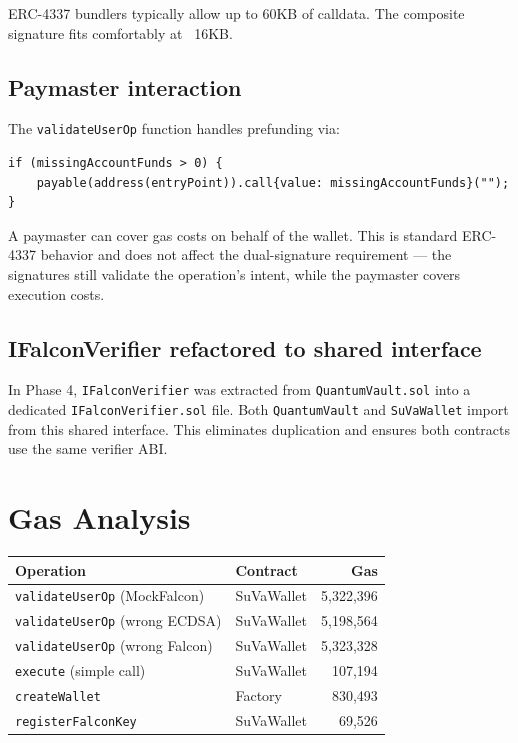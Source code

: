 \documentclass[11pt,a4paper]{article}
\begin{document}
ERC-4337 bundlers typically allow up to 60KB of calldata. The composite signature fits
comfortably at ~16KB.

\subsection{Paymaster interaction}

The \texttt{validateUserOp} function handles prefunding via:
\begin{lstlisting}[style=solidity]
if (missingAccountFunds > 0) {
    payable(address(entryPoint)).call{value: missingAccountFunds}("");
}
\end{lstlisting}

A paymaster can cover gas costs on behalf of the wallet. This is standard ERC-4337 behavior
and does not affect the dual-signature requirement --- the signatures still validate the
operation's intent, while the paymaster covers execution costs.

\subsection{IFalconVerifier refactored to shared interface}

In Phase 4, \texttt{IFalconVerifier} was extracted from \texttt{QuantumVault.sol} into a
dedicated \texttt{IFalconVerifier.sol} file. Both \texttt{QuantumVault} and \texttt{SuVaWallet}
import from this shared interface. This eliminates duplication and ensures both contracts
use the same verifier ABI.

\section{Gas Analysis}

\begin{center}
\begin{tabular}{llr}
\toprule
\textbf{Operation} & \textbf{Contract} & \textbf{Gas} \\
\midrule
\texttt{validateUserOp} (MockFalcon) & SuVaWallet & 5,322,396 \\
\texttt{validateUserOp} (wrong ECDSA) & SuVaWallet & 5,198,564 \\
\texttt{validateUserOp} (wrong Falcon) & SuVaWallet & 5,323,328 \\
\texttt{execute} (simple call)         & SuVaWallet &   107,194 \\
\texttt{createWallet}                  & Factory    &   830,493 \\
\texttt{registerFalconKey}             & SuVaWallet &    69,526 \\
\bottomrule
\end{tabular}
\end{center}
\end{document}

